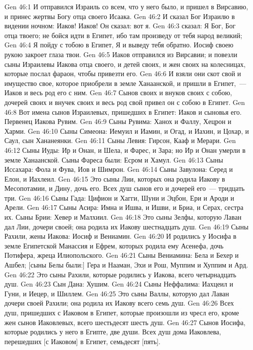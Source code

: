 \vs Gen 46:1 И отправился Израиль со всем, что у него было, и пришел в Вирсавию, и принес жертвы Богу отца своего Исаака.
\vs Gen 46:2 И сказал Бог Израилю в видении ночном: Иаков! Иаков! Он сказал: вот я.
\vs Gen 46:3  сказал: Я Бог, Бог отца твоего; не бойся идти в Египет, ибо там произведу от тебя народ великий;
\vs Gen 46:4 Я пойду с тобою в Египет, Я и выведу тебя обратно. Иосиф своею рукою закроет глаза твои.
\rsbpar\vs Gen 46:5 Иаков отправился из Вирсавии; и повезли сыны Израилевы Иакова отца своего, и детей своих, и жен своих на колесницах, которые послал фараон, чтобы привезти его.
\vs Gen 46:6 И взяли они скот свой и имущество свое, которое приобрели в земле Ханаанской, и пришли в Египет,~--- Иаков и весь род его с ним.
\vs Gen 46:7 Сынов своих и внуков своих с собою, дочерей своих и внучек своих и весь род свой привел он с собою в Египет.
\rsbpar\vs Gen 46:8 Вот имена сынов Израилевых, пришедших в Египет: Иаков и сыновья его. Первенец Иакова Рувим.
\vs Gen 46:9 Сыны Рувима: Ханох и Фаллу, Хецрон и Харми.
\vs Gen 46:10 Сыны Симеона: Иемуил и Иамин, и Огад, и Иахин, и Цохар, и Саул, сын Хананеянки.
\vs Gen 46:11 Сыны Левия: Гирсон, Кааф и Мерари.
\vs Gen 46:12 Сыны Иуды: Ир и Онан, и Шела, и Фарес, и Зара; но Ир и Онан умерли в земле Ханаанской. Сыны Фареса были: Есром и Хамул.
\vs Gen 46:13 Сыны Иссахара: Фола и Фува, Иов и Шимрон.
\vs Gen 46:14 Сыны Завулона: Серед и Елон, и Иахлеил.
\vs Gen 46:15 Это сыны Лии, которых она родила Иакову в Месопотамии, и Дину, дочь его. Всех душ сынов его и дочерей его~--- тридцать три.
\vs Gen 46:16 Сыны Гада: Цифион и Хагги, Шуни и Эцбон, Ери и Ароди и Арели.
\vs Gen 46:17 Сыны Асира: Имна и Ишва, и Ишви, и Бриа, и Серах, сестра их. Сыны Брии: Хевер и Малхиил.
\vs Gen 46:18 Это сыны Зелфы, которую Лаван дал Лии, дочери своей; она родила их Иакову шестнадцать душ.
\vs Gen 46:19 Сыны Рахили, жены Иакова: Иосиф и Вениамин.
\vs Gen 46:20 И родились у Иосифа в земле Египетской Манассия и Ефрем, которых родила ему Асенефа, дочь Потифера, жреца Илиопольского.
\vs Gen 46:21 Сыны Вениамина: Бела и Бехер и Ашбел; [сыны Белы были:] Гера и Нааман, Эхи и Рош, Муппим и Хуппим и Ард.
\vs Gen 46:22 Это сыны Рахили, которые родились у Иакова, всего четырнадцать душ.
\vs Gen 46:23 Сын Дана: Хушим.
\vs Gen 46:24 Сыны Неффалима: Иахцеил и Гуни, и Иецер, и Шиллем.
\vs Gen 46:25 Это сыны Валлы, которую дал Лаван дочери своей Рахили; она родила их Иакову всего семь душ.
\vs Gen 46:26 Всех душ, пришедших с Иаковом в Египет, которые произошли из чресл его, кроме жен сынов Иаковлевых, всего шестьдесят шесть душ.
\vs Gen 46:27 Сынов Иосифа, которые родились у него в Египте, две души. Всех душ дома Иаковлева, перешедших [с Иаковом] в Египет, семьдесят [пять].
